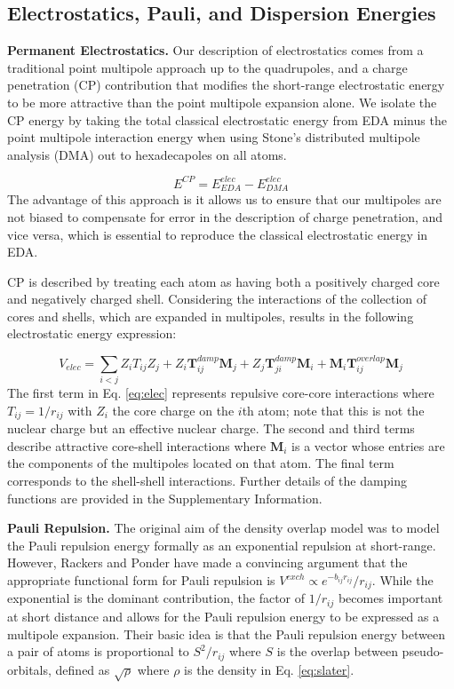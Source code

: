 \documentclass[journal=jctcce,manuscript=article]{achemso}
\begin{document}
\subsection*{Electrostatics, Pauli, and Dispersion Energies}
\textbf{Permanent Electrostatics.} Our description of electrostatics comes from a traditional point multipole approach up to the quadrupoles, and a charge penetration (CP) contribution that modifies the short-range electrostatic energy to be more attractive than the point multipole expansion alone. We isolate the CP energy by taking the total classical electrostatic energy from EDA minus the point multipole interaction energy when using Stone's distributed multipole analysis (DMA)\cite{stone1981distributed,stone1985distributeda}
out to hexadecapoles on all atoms.

\begin{equation}
  E^{CP}=E^{elec}_{EDA}-E^{elec}_{DMA}
  \label{eq:cp}
\end{equation}
The advantage of this approach is it allows us to ensure that our multipoles are not biased to compensate for error in the description of charge penetration, and vice versa, which is essential to reproduce the classical electrostatic energy in EDA.

CP is described by treating each atom as having both a positively charged core and negatively charged shell. Considering the interactions of the collection of cores and shells, which are expanded in multipoles, results in the following electrostatic energy expression:

\begin{equation}
  V_{elec}=\sum_{i<j}Z_iT_{ij}Z_j+Z_i\bm{T}_{ij}^{damp}\bm{M}_j+Z_j\bm{T}_{ji}^{damp}\bm{M}_i+\bm{M}_i\bm{T}_{ij}^{overlap}\bm{M}_j
  \label{eq:elec}
\end{equation}
The first term in Eq. \ref{eq:elec} represents repulsive core-core interactions where $T_{ij}=1/r_{ij}$ with $Z_i$ the core charge on the $i$th atom; note that this is not the nuclear charge but an effective nuclear charge. The second and third terms describe attractive core-shell interactions where $\bm{M}_i$ is a vector whose entries are the components of the multipoles located on that atom. The final term corresponds to the shell-shell interactions. Further details of the damping functions are provided in the Supplementary Information.

\textbf{Pauli Repulsion.} The original aim of the density overlap model was to model the Pauli repulsion energy formally as an exponential repulsion at short-range.\cite{wallqvist1989new,wheatley1990overlap,gordon1996approximate} However, Rackers and Ponder have made a convincing argument that the appropriate functional form for Pauli repulsion is  $V^{exch}\propto e^{-b_{ij}r_{ij}}/r_{ij}$.\cite{rackers2019classical,rackers2021polarizable} While the exponential is the dominant contribution, the factor of $1/r_{ij}$ becomes important at short distance and allows for the Pauli repulsion energy to be expressed as a multipole expansion. Their basic idea is that the Pauli repulsion energy between a pair of atoms is proportional to $S^2/r_{ij}$ where $S$ is the overlap between pseudo-orbitals, defined as $\sqrt{\rho}$ where $\rho$ is the density in Eq. \ref{eq:slater}.
\end{document}

